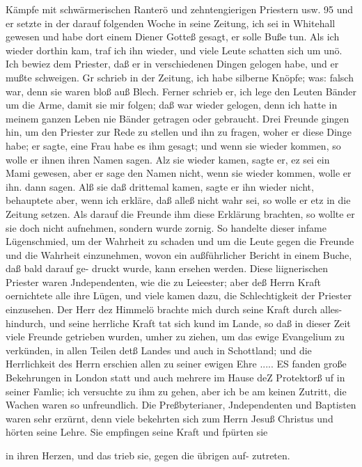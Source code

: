 Kämpfe mit schwärmerischen Ranterö und zehntengierigen Priestern usw. 95
und er setzte in der darauf folgenden Woche in seine Zeitung,
ich sei in Whitehall gewesen und habe dort einem Diener Gotteß
gesagt, er solle Buße tun. Als ich wieder dorthin kam, traf ich
ihn wieder, und viele Leute schatten sich um unö. Ich bewiez
dem Priester, daß er in verschiedenen Dingen gelogen habe, und
er mußte schweigen. Gr schrieb in der Zeitung, ich habe silberne
Knöpfe; was: falsch war, denn sie waren bloß auß Blech. Ferner
schrieb er, ich lege den Leuten Bänder um die Arme, damit sie
mir folgen; daß war wieder gelogen, denn ich hatte in meinem
ganzen Leben nie Bänder getragen oder gebraucht. Drei Freunde
gingen hin, um den Priester zur Rede zu stellen und ihn zu
fragen, woher er diese Dinge habe; er sagte, eine Frau habe es
ihm gesagt; und wenn sie wieder kommen, so wolle er ihnen ihren
Namen sagen. Alz sie wieder kamen, sagte er, ez sei ein Mami
gewesen, aber er sage den Namen nicht, wenn sie wieder kommen,
wolle er ihn. dann sagen. Alß sie daß drittemal kamen, sagte
er ihn wieder nicht, behauptete aber, wenn ich erkläre, daß alleß
nicht wahr sei, so wolle er etz in die Zeitung setzen. Als darauf
die Freunde ihm diese Erklärung brachten, so wollte er sie doch
nicht aufnehmen, sondern wurde zornig. So handelte dieser
infame Lügenschmied, um der Wahrheit zu schaden und um die
Leute gegen die Freunde und die Wahrheit einzunehmen, wovon
ein außführlicher Bericht in einem Buche, daß bald darauf ge-
druckt wurde, kann ersehen werden. Diese liignerischen Priester
waren Jndependenten, wie die zu Leieester; aber deß Herrn
Kraft oernichtete alle ihre Lügen, und viele kamen dazu, die
Schlechtigkeit der Priester einzusehen. Der Herr dez Himmelö
brachte mich durch seine Kraft durch alles- hindurch, und seine
herrliche Kraft tat sich kund im Lande, so daß in dieser Zeit
viele Freunde getrieben wurden, umher zu ziehen, um das ewige
Evangelium zu verkünden, in allen Teilen detß Landes und auch
in Schottland; und die Herrlichkeit des Herrn erschien allen zu
seiner ewigen Ehre ..... ES fanden große Bekehrungen in
London statt und auch mehrere im Hause deZ Protektorß uf in
seiner Famlie; ich versuchte zu ihm zu gehen, aber ich be am
keinen Zutritt, die Wachen waren so unfreundlich.
Die Preßbyterianer, Jndependenten und Baptisten waren sehr
erzürnt, denn viele bekehrten sich zum Herrn Jesuß Christus und
hörten seine Lehre. Sie empfingen seine Kraft und fpürten sie


in ihren Herzen, und das trieb sie, gegen die übrigen auf-
zutreten.

